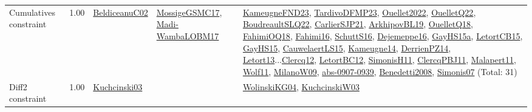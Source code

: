 {\begin{longtable}{p{3cm}r>{\raggedright\arraybackslash}p{6cm}>{\raggedright\arraybackslash}p{6cm}>{\raggedright\arraybackslash}p{8cm}}
\index{Cumulatives constraint}\index{Constraints!Cumulatives constraint}Cumulatives constraint &  1.00 & \hyperref[detail:BeldiceanuC02]{BeldiceanuC02} & \hyperref[detail:MossigeGSMC17]{MossigeGSMC17}, \hyperref[detail:Madi-WambaLOBM17]{Madi-WambaLOBM17} & \hyperref[detail:KameugneFND23]{KameugneFND23}, \hyperref[detail:TardivoDFMP23]{TardivoDFMP23}, \hyperref[detail:Ouellet2022]{Ouellet2022}, \hyperref[detail:OuelletQ22]{OuelletQ22}, \hyperref[detail:BoudreaultSLQ22]{BoudreaultSLQ22}, \hyperref[detail:CarlierSJP21]{CarlierSJP21}, \hyperref[detail:ArkhipovBL19]{ArkhipovBL19}, \hyperref[detail:OuelletQ18]{OuelletQ18}, \hyperref[detail:FahimiOQ18]{FahimiOQ18}, \hyperref[detail:Fahimi16]{Fahimi16}, \hyperref[detail:SchuttS16]{SchuttS16}, \hyperref[detail:Dejemeppe16]{Dejemeppe16}, \hyperref[detail:GayHS15a]{GayHS15a}, \hyperref[detail:LetortCB15]{LetortCB15}, \hyperref[detail:GayHS15]{GayHS15}, \hyperref[detail:CauwelaertLS15]{CauwelaertLS15}, \hyperref[detail:Kameugne14]{Kameugne14}, \hyperref[detail:DerrienPZ14]{DerrienPZ14}, \hyperref[detail:Letort13]{Letort13}...\hyperref[detail:Clercq12]{Clercq12}, \hyperref[detail:LetortBC12]{LetortBC12}, \hyperref[detail:SimonisH11]{SimonisH11}, \hyperref[detail:ClercqPBJ11]{ClercqPBJ11}, \hyperref[detail:Malapert11]{Malapert11}, \hyperref[detail:Wolf11]{Wolf11}, \hyperref[detail:MilanoW09]{MilanoW09}, \hyperref[detail:abs-0907-0939]{abs-0907-0939}, \hyperref[detail:Benedetti2008]{Benedetti2008}, \hyperref[detail:Simonis07]{Simonis07} (Total: 31)\\
\index{Diff2 constraint}\index{Constraints!Diff2 constraint}Diff2 constraint &  1.00 & \hyperref[detail:Kuchcinski03]{Kuchcinski03} &  & \hyperref[detail:WolinskiKG04]{WolinskiKG04}, \hyperref[detail:KuchcinskiW03]{KuchcinskiW03}\\

\end{longtable}}
